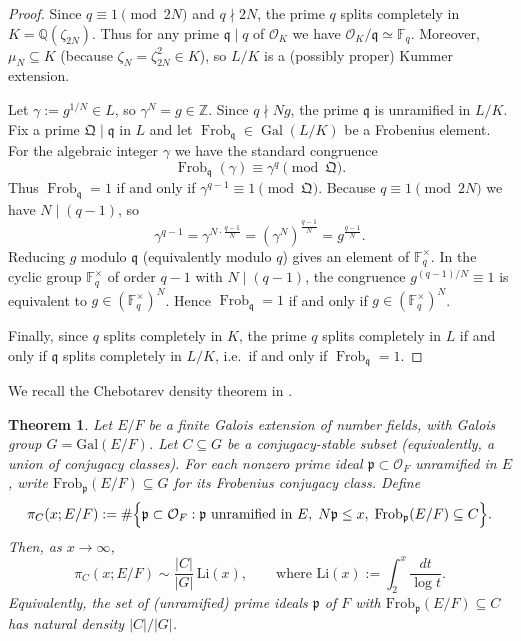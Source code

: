 \documentclass[11pt,letterpaper]{amsart}
\newcommand{\Z}{\mathbb{Z}}
\newcommand{\Q}{\mathbb{Q}}
\newcommand{\F}{\mathbb{F}}
\newcommand{\Ocal}{\mathcal{O}}
\newcommand{\Gal}{\operatorname{Gal}}
\newcommand{\Frob}{\operatorname{Frob}}
\theoremstyle{plain}
\newtheorem{theorem}{Theorem}[section]
\theoremstyle{definition}
\theoremstyle{remark}
\theoremstyle{plain}
\begin{document}
\begin{proof}
Since $q\equiv 1\pmod{2N}$ and $q\nmid 2N$, the prime $q$ splits completely in $K=\Q(\zeta_{2N})$.
Thus for any prime $\mathfrak q\mid q$ of $\Ocal_K$ we have $\Ocal_K/\mathfrak q\simeq\F_q$.
Moreover, $\mu_N\subseteq K$ (because $\zeta_N=\zeta_{2N}^2\in K$), so $L/K$ is a (possibly proper) Kummer extension.

Let $\gamma:=g^{1/N}\in L$, so $\gamma^N=g\in\Z$.  Since $q\nmid Ng$, the prime $\mathfrak q$ is unramified in $L/K$.
Fix a prime $\mathfrak Q\mid\mathfrak q$ in $L$ and let $\Frob_{\mathfrak q}\in\Gal(L/K)$ be a Frobenius element.
For the algebraic integer $\gamma$ we have the standard congruence
\[
\Frob_{\mathfrak q}(\gamma)\equiv \gamma^{q}\pmod{\mathfrak Q}.
\]
Thus $\Frob_{\mathfrak q}=1$ if and only if $\gamma^{q-1}\equiv 1\pmod{\mathfrak Q}$.
Because $q\equiv 1\pmod{2N}$ we have $N\mid(q-1)$, so
\[
\gamma^{q-1}=\gamma^{N\cdot\frac{q-1}{N}}=(\gamma^N)^{\frac{q-1}{N}}=g^{\frac{q-1}{N}}.
\]
Reducing $g$ modulo $\mathfrak q$ (equivalently modulo $q$) gives an element of $\F_q^\times$.
In the cyclic group $\F_q^\times$ of order $q-1$ with $N\mid(q-1)$, the congruence
$g^{(q-1)/N}\equiv 1$ is equivalent to $g\in(\F_q^\times)^N$.
Hence $\Frob_{\mathfrak q}=1$ if and only if $g\in(\F_q^\times)^N$.

Finally, since $q$ splits completely in $K$, the prime $q$ splits completely in $L$ if and only if
$\mathfrak q$ splits completely in $L/K$, i.e.\ if and only if $\Frob_{\mathfrak q}=1$.
\end{proof}

We recall the Chebotarev density theorem in \cite[§3]{SerreChebotarev}.
\begin{theorem}
Let $E/F$ be a finite Galois extension of number fields, with Galois group
$G=\mathrm{Gal}(E/F)$.  Let $C\subseteq G$ be a conjugacy-stable subset
(equivalently, a union of conjugacy classes).  For each nonzero prime ideal
$\mathfrak p\subset\mathcal O_F$ unramified in $E$, write
$\mathrm{Frob}_{\mathfrak p}(E/F)\subseteq G$ for its Frobenius conjugacy class.
Define
\[
\pi_C(x;E/F)
:=\#\Bigl\{\mathfrak p \subset \mathcal O_F :
\mathfrak p \text{ unramified in }E,\;
N\mathfrak p\le x,\;
\mathrm{Frob}_{\mathfrak p}(E/F)\subseteq C
\Bigr\}.
\]
Then, as $x\to\infty$,
\[
\pi_C(x;E/F)\sim \frac{|C|}{|G|}\,\mathrm{Li}(x),
\qquad\text{where }\mathrm{Li}(x):=\int_2^x \frac{dt}{\log t}.
\]
Equivalently, the set of (unramified) prime ideals $\mathfrak p$ of $F$ with
$\mathrm{Frob}_{\mathfrak p}(E/F)\subseteq C$ has natural density $|C|/|G|$.
\end{theorem}
\end{document}
